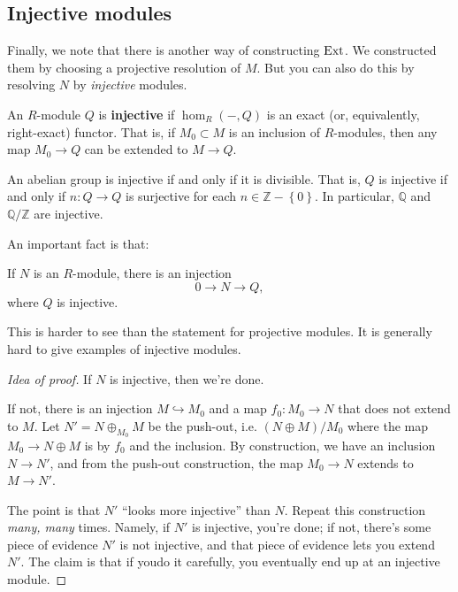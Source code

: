 \subsection{Injective modules}

Finally, we note that there is another way of constructing
$\mathrm{Ext}$. We
constructed them by choosing a projective resolution of $M$. But
you can also
do this by resolving $N$ by \emph{injective} modules.
\begin{definition}
An $R$-module $Q$ is \textbf{injective} if $\hom_R(-,Q)$ is an
exact (or,
equivalently, right-exact) functor. That is, if $M_0 \subset M$
is an inclusion
of $R$-modules, then any map $M_0 \to Q$ can be extended to $M
\to Q$.
\end{definition}


\begin{example}
An abelian group is injective if and only if it is divisible.
That is, $Q$
is injective
if and only if $n: Q \to Q$ is surjective for each $n \in
\mathbb{Z} -
\left\{0\right\}$.
In particular, $\mathbb{Q}$ and $\mathbb{Q}/\mathbb{Z}$ are
injective.
\end{example}

An important fact is that:

\begin{proposition}
If $N$ is an $R$-module, there is an injection
\[ 0 \to N \to Q,  \]
where $Q$ is injective.
\end{proposition}
This is harder to see than the statement for projective modules.
It is
generally hard to give examples of injective modules.
\begin{proof}[Idea of proof] If $N$ is injective, then we're
done.

If not, there is an injection $M \hookrightarrow M_0$ and a map
$f_0: M_0 \to N$
that does not extend to $M$. Let $N' = N \oplus_{M_0} M$ be the
push-out, i.e.
$(N \oplus M)/M_0$ where the map $M_0 \to N \oplus M$ is by
$f_0$ and the
inclusion. By construction, we have an inclusion $N \to N'$, and
from the
push-out construction, the map $M_0 \to N$ extends to $M \to
N'$.

The point is that $N'$ ``looks more injective'' than $N$. Repeat
this
construction \emph{many, many} times. Namely, if $N'$ is
injective, you're
done; if not, there's some piece of evidence $N'$ is not
injective, and that
piece of evidence lets you extend $N'$. The claim is that if
youdo it
carefully, you eventually end up at an injective module.

\end{proof}


